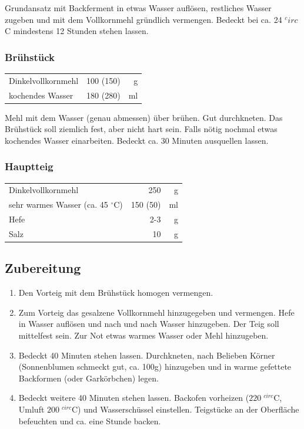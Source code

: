 Grundansatz mit Backferment in etwas Wasser auflösen, restliches Wasser zugeben und mit dem Vollkornmehl gründlich vermengen. Bedeckt bei ca. 24 $^circ $C mindestens 12 Stunden stehen lassen. 

\subsubsection*{Brühstück}
\begin{tabular}{lrr}
    Dinkelvollkornmehl                  & 100 (150) &  g \\
    kochendes Wasser  & 180 (280) & ml \\
\end{tabular} 

Mehl mit dem Wasser (genau abmessen) über brühen. Gut durchkneten. Das Brühstück soll ziemlich fest, aber nicht hart sein. Falls nötig nochmal etwas kochendes Wasser einarbeiten. Bedeckt ca. 30 Minuten ausquellen lassen.  

\subsubsection*{Hauptteig}
\begin{tabular}{lrr}
    Dinkelvollkornmehl & 250 &  g \\
    sehr warmes Wasser (ca. 45 $^\circ$C) & 150 (50) & ml \\
    Hefe   & 2-3          &   g \\
    Salz        & 10 & g \\
\end{tabular} 

\subsection*{Zubereitung}

\begin{enumerate}
    \item Den Vorteig mit dem Brühstück homogen vermengen.
    \item Zum Vorteig das gesalzene Vollkornmehl hinzugegeben und vermengen. Hefe in Wasser auflösen und nach und nach Wasser hinzugeben. Der Teig soll mittelfest sein. Zur Not etwas warmes Wasser oder Mehl hinzugeben. 
    \item Bedeckt 40 Minuten stehen lassen. Durchkneten, nach Belieben Körner (Sonnenblumen schmeckt gut, ca. 100g) hinzugeben und in warme gefettete Backformen  (oder Garkörbchen) legen.
    \item Bedeckt weitere 40 Minuten stehen lassen. Backofen vorheizen ($ 220\;^{circ} $C, Umluft $ 200\;^{circ} $C) und Wasserschüssel einstellen. Teigstücke an der Oberfläche befeuchten und ca. eine Stunde backen.    
\end{enumerate}  

